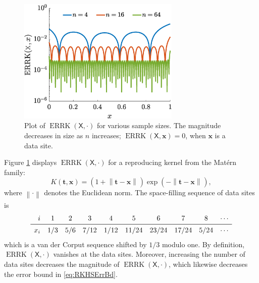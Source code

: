 \documentclass[]{mcom-l}
\theoremstyle{theorem}
\theoremstyle{remark}
\DeclareMathOperator{\errK}{ERRK}
\newcommand{\mX}{\mathsf{X}}
\newcommand{\bx}{{\boldsymbol{x}}}
\newcommand{\bt}{{\boldsymbol{t}}}
\newcommand{\norm}[2][{}]{\ensuremath{\left \lVert #2 \right \rVert}_{#1}}
\begin{document}
\begin{figure}[H]
	\centering
	\includegraphics[height =6cm]{ProgramsImages/errKplot.eps}
	\caption{Plot of $\errK(\mX,\cdot)$ for various sample sizes.  The magnitude decreases in size as $n$ increases; $\errK(\mX,\bx) = 0$, when $\bx$ is a data site. \label{fig:errK}}
\end{figure}

Figure \ref{fig:errK} displays   $\errK(\mX,\cdot)$  for a reproducing kernel from the Mat\'ern family: 
	\begin{equation} \label{eq:MaternOne}
K(\bt,\bx) = (1 +  \norm{\bt-\bx}) \exp(-\norm{\bt-\bx}),
\end{equation}
where $\norm{\cdot}$ denotes the Euclidean norm.  The space-filling sequence of data sites is 
\begin{equation} \label{eq:FixedVDCDes}
\begin{array}{rccccccccc}
i  & 1 & 2 & 3 & 4 & 5 & 6 & 7 & 8 & \cdots\\
\midrule
x_i & 1/3 & 5/6 & 7/12 & 1/12 & 11/24 & 23/24 & 17/24 & 5 /24 & \cdots
\end{array}
\end{equation}
which is a van der Corput sequence \cite{} shifted by $1/3$ modulo one.  By definition, $\errK(\mX,\cdot)$ vanishes at the data sites.  Moreover, increasing the number of data sites decreases the magnitude of $\errK(\mX,\cdot)$, which likewise decreases the error bound in \eqref{eq:RKHSErrBd}.
\end{document}
